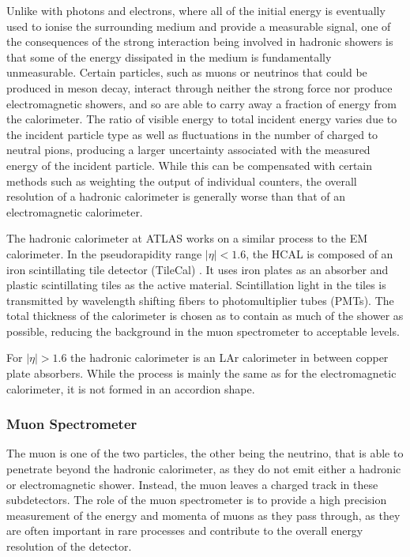 \documentclass{article}
\begin{document}
Unlike with photons and electrons, where all of the initial energy is eventually used to ionise the surrounding medium and provide a measurable signal, one of the consequences of the strong interaction being involved in hadronic showers is that some of the energy dissipated in the medium is fundamentally unmeasurable. Certain particles, such as muons or neutrinos that could be produced in meson decay, interact through neither the strong force nor produce electromagnetic showers, and so are able to carry away a fraction of energy from the calorimeter. The ratio of visible energy to total incident energy varies due to the incident particle type as well as fluctuations in the number of charged to neutral pions, producing a larger uncertainty associated with the measured energy of the incident particle. While this can be compensated with certain methods such as weighting the output of individual counters, the overall resolution of a hadronic calorimeter is generally worse than that of an electromagnetic calorimeter.

The hadronic calorimeter at ATLAS works on a similar process to the EM calorimeter. In the pseudorapidity range $|\eta|<1.6$, the HCAL is composed of an iron scintillating tile detector (TileCal) \cite{ATLASCalorimetry}. It uses iron plates as an absorber and plastic scintillating tiles as the active material. Scintillation light in the tiles is transmitted by wavelength shifting fibers to photomultiplier tubes (PMTs). The total thickness of the calorimeter is chosen as to contain as much of the shower as possible, reducing the background in the muon spectrometer to acceptable levels. 

For $|\eta|>1.6$ the hadronic calorimeter is an LAr calorimeter in between copper plate absorbers. While the process is mainly the same as for the electromagnetic calorimeter, it is not formed in an accordion shape.

\subsubsection{Muon Spectrometer}
\label{sec:ATLAS_DetectorSchematics_Muon}

The muon is one of the two particles, the other being the neutrino, that is able to penetrate beyond the hadronic calorimeter, as they do not emit either a hadronic or electromagnetic shower. Instead, the muon leaves a charged track in these subdetectors. The role of the muon spectrometer is to provide a high precision measurement of the energy and momenta of muons as they pass through, as they are often important in rare processes and contribute to the overall energy resolution of the detector.
\end{document}
